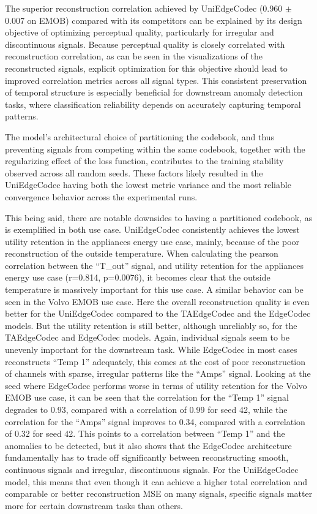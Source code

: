 The superior reconstruction correlation achieved by UniEdgeCodec (0.960 $\pm$ 0.007 on EMOB) compared with its competitors can be explained by its design objective of optimizing perceptual quality, particularly for irregular and discontinuous signals. Because perceptual quality is closely correlated with reconstruction correlation, as can be seen in the visualizations of the reconstructed signals, explicit optimization for this objective should lead to improved correlation metrics across all signal types. This consistent preservation of temporal structure is especially beneficial for downstream anomaly detection tasks, where classification reliability depends on accurately capturing temporal patterns. 

The model's architectural choice of partitioning the codebook, and thus preventing signals from competing within the same codebook, together with the regularizing effect of the loss function, contributes to the training stability observed across all random seeds. These factors likely resulted in the UniEdgeCodec having both the lowest metric variance and the most reliable convergence behavior across the experimental runs. 

This being said, there are notable downsides to having a partitioned codebook, as is exemplified in both use case. UniEdgeCodec consistently achieves the lowest utility retention in the appliances energy use case, mainly, because of the poor reconstruction of the outside temperature. When calculating the pearson correlation between the ``T\_out'' signal, and utility retention for the appliances energy use case (r=0.814, p=0.0076), it becomes clear that the outside temperature is massively important for this use case. A similar behavior can be seen in the Volvo EMOB use case. Here the overall reconstruction quality is even better for the UniEdgeCodec compared to the TAEdgeCodec and the EdgeCodec models. But the utility retention is still better, although unreliably so, for the TAEdgeCodec and EdgeCodec models. Again, individual signals seem to be unevenly important for the downstream task. While EdgeCodec in most cases reconstructs ``Temp 1'' adequately, this comes at the cost of poor reconstruction of channels with sparse, irregular patterns like the ``Amps'' signal. Looking at the seed where EdgeCodec performs worse in terms of utility retention for the Volvo EMOB use case, it can be seen that the correlation for the ``Temp 1'' signal degrades to 0.93, compared with a correlation of 0.99 for seed 42, while the correlation for the ``Amps'' signal improves to 0.34, compared with a correlation of 0.32 for seed 42. This points to a correlation between ``Temp 1'' and the anomalies to be detected, but it also shows that the EdgeCodec architecture fundamentally has to trade off significantly between reconstructing smooth, continuous signals and irregular, discontinuous signals. For the UniEdgeCodec model, this means that even though it can achieve a higher total correlation and comparable or better reconstruction MSE on many signals, specific signals matter more for certain downstream tasks than others.

